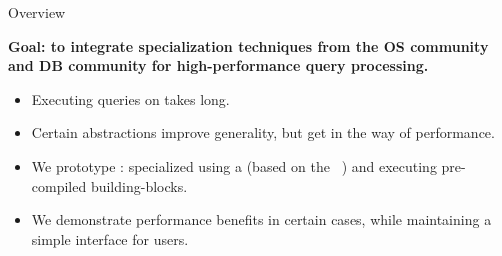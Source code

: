 \begin{block}{Overview}
\begin{overviewbox}
  \textbf{Goal: to integrate specialization techniques from the OS
    community  and DB community
     for high-performance query
    processing.}
\end{overviewbox}

  \begin{itemize}

  \item Executing queries on  takes long.

  \item Certain abstractions improve generality, but get in the way of
    performance.


  \item We prototype : specialized using a
     (based on the ~\cite{HALE:2015:NAUTILUS}) and executing
    pre-compiled building-blocks.


  \item We demonstrate performance benefits in certain cases, while
    maintaining a simple interface for users.

  \end{itemize}
\end{block}

